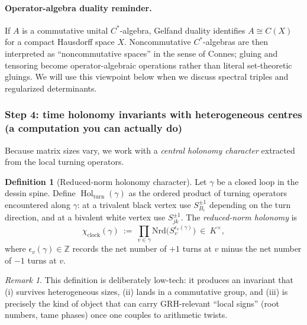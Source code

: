 \documentclass[11pt,oneside]{amsbook}
\numberwithin{equation}{section}
\theoremstyle{plain}
\theoremstyle{definition}
\newtheorem{definition}[theorem]{Definition}
\theoremstyle{remark}
\newtheorem{remark}[theorem]{Remark}
\newcommand{\Z}{\mathbb{Z}}
\DeclareMathOperator{\Hol}{\mathrm{Hol}}
\begin{document}
\paragraph{Operator-algebra duality reminder.}
If $A$ is a commutative unital $C^\ast$-algebra, Gelfand duality identifies $A\cong C(X)$ for a compact Hausdorff space $X$.
Noncommutative $C^\ast$-algebras are then interpreted as ``noncommutative spaces'' in the sense of Connes; gluing and tensoring become operator-algebraic operations rather than literal set-theoretic gluings.
We will use this viewpoint below when we discuss spectral triples and regularized determinants.

\subsubsection{Step 4: time holonomy invariants with heterogeneous centres (a computation you can actually do)}

Because matrix sizes vary, we work with a \emph{central holonomy character} extracted from the local turning operators.

\begin{definition}[Reduced-norm holonomy character]
\label{def:nrd_holonomy}
Let $\gamma$ be a closed loop in the dessin spine.
Define $\Hol_{\mathrm{turn}}(\gamma)$ as the ordered product of turning operators encountered along $\gamma$:
at a trivalent black vertex use $S_{B_i}^{\pm 1}$ depending on the turn direction, and at a bivalent white vertex use $S_{jk}^{\pm 1}$.
The \emph{reduced-norm holonomy} is
\[
\chi_{\mathrm{clock}}(\gamma)\ :=\ \prod_{v\in \gamma} \mathrm{Nrd}\big(S_v^{\epsilon_v(\gamma)}\big)\ \in\ K^\times,
\]
where $\epsilon_v(\gamma)\in\Z$ records the net number of $+1$ turns at $v$ minus the net number of $-1$ turns at $v$.
\end{definition}

\begin{remark}
This definition is deliberately low-tech: it produces an invariant that (i) survives heterogeneous sizes, (ii) lands in a commutative group, and (iii) is precisely the kind of object that can carry GRH-relevant ``local signs'' (root numbers, tame phases) once one couples to arithmetic twists.
\end{remark}
\end{document}
